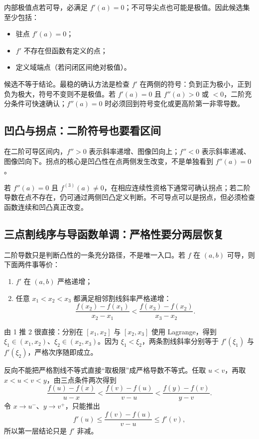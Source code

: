 \documentclass[UTF8,fontset=none,11pt,a4paper]{ctexart}
\begin{document}
内部极值点若可导，必满足 $f'(a)=0$；不可导尖点也可能是极值。因此候选集至少包括：
\begin{itemize}
  \item 驻点 $f'(a)=0$；
  \item $f'$ 不存在但函数有定义的点；
  \item 定义域端点（若问闭区间绝对极值）。
\end{itemize}

候选不等于结论。最稳的确认方法是检查 $f'$ 在两侧的符号：负到正为极小，正到负为极大，符号不变则不是极值。若 $f'(a)=0$ 且 $f''(a)>0$ 或 $<0$，二阶充分条件可快速确认；$f''(a)=0$ 时必须回到符号变化或更高阶第一非零导数。

\subsection{凹凸与拐点：二阶符号也要看区间}

在二阶可导区间内，$f''>0$ 表示斜率递增、图像凹向上；$f''<0$ 表示斜率递减、图像凹向下。拐点的核心是凹凸性在点两侧发生改变，不是单独看到 $f''(a)=0$。

若 $f''(a)=0$ 且 $f^{(3)}(a)\ne0$，在相应连续性资格下通常可确认拐点；若二阶导数在点不存在，仍可通过两侧凹凸定义判断。不可导点可以是拐点，但必须检查函数连续和凹凸真正改变。

\subsection{三点割线序与导函数单调：严格性要分两层恢复}

二阶导数只是判断凸性的一条充分路径，不是唯一入口。若 $f$ 在 $(a,b)$ 可导，则下面两件事等价：
\begin{enumerate}
  \item $f'$ 在 $(a,b)$ 严格递增；
  \item 任意 $x_1<x_2<x_3$ 都满足相邻割线斜率严格递增：
  \[
  \frac{f(x_2)-f(x_1)}{x_2-x_1}
  <
  \frac{f(x_3)-f(x_2)}{x_3-x_2}.
  \]
\end{enumerate}

由 1 推 2 很直接：分别在 $[x_1,x_2]$ 与 $[x_2,x_3]$ 使用 Lagrange，得到
$\xi_1\in(x_1,x_2)$、$\xi_2\in(x_2,x_3)$。因为 $\xi_1<\xi_2$，两条割线斜率分别等于
$f'(\xi_1)$ 与 $f'(\xi_2)$，严格次序随即成立。

反向不能把严格割线不等式直接``取极限''成严格导数不等式。任取 $u<v$，再取
$x<u<v<y$，由三点条件两次得到
\[
\frac{f(u)-f(x)}{u-x}
<
\frac{f(v)-f(u)}{v-u}
<
\frac{f(y)-f(v)}{y-v}.
\]
令 $x\to u^-$、$y\to v^+$，只能推出
\[
f'(u)\le
\frac{f(v)-f(u)}{v-u}
\le f'(v),
\]
所以第一层结论只是 $f'$ 非减。
\end{document}

